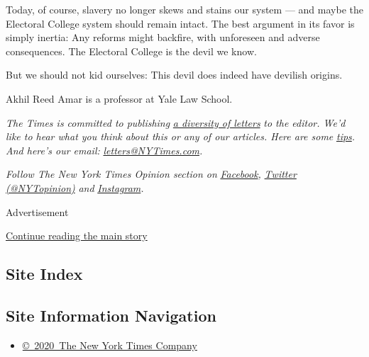 Today, of course, slavery no longer skews and stains our system --- and
maybe the Electoral College system should remain intact. The best
argument in its favor is simply inertia: Any reforms might backfire,
with unforeseen and adverse consequences. The Electoral College is the
devil we know.

But we should not kid ourselves: This devil does indeed have devilish
origins.

Akhil Reed Amar is a professor at Yale Law School.

\emph{The Times is committed to publishing}
\href{https://www.nytimes3xbfgragh.onion/2019/01/31/opinion/letters/letters-to-editor-new-york-times-women.html}{\emph{a
diversity of letters}} \emph{to the editor. We'd like to hear what you
think about this or any of our articles. Here are some}
\href{https://help.nytimes3xbfgragh.onion/hc/en-us/articles/115014925288-How-to-submit-a-letter-to-the-editor}{\emph{tips}}\emph{.
And here's our email:}
\href{mailto:letters@NYTimes.com}{\emph{letters@NYTimes.com}}\emph{.}

\emph{Follow The New York Times Opinion section on}
\href{https://www.facebookcorewwwi.onion/nytopinion}{\emph{Facebook}}\emph{,}
\href{http://twitter.com/NYTOpinion}{\emph{Twitter (@NYTopinion)}}
\emph{and}
\href{https://www.instagram.com/nytopinion/}{\emph{Instagram}}\emph{.}

Advertisement

\protect\hyperlink{after-bottom}{Continue reading the main story}

\hypertarget{site-index}{%
\subsection{Site Index}\label{site-index}}

\hypertarget{site-information-navigation}{%
\subsection{Site Information
Navigation}\label{site-information-navigation}}

\begin{itemize}
\tightlist
\item
  \href{https://help.nytimes3xbfgragh.onion/hc/en-us/articles/115014792127-Copyright-notice}{©~2020~The
  New York Times Company}
\end{itemize}

